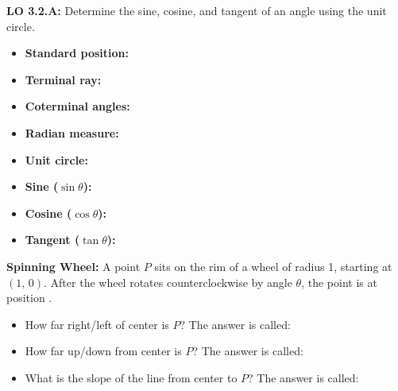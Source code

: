 \documentclass[10pt]{article}
\begin{document}
\namedateperiod

\vspace{0.10in}

\begin{objectivebox}
\textbf{LO 3.2.A:} Determine the sine, cosine, and tangent of an angle using the unit circle.\\[4pt]
\end{objectivebox}

\vspace{0.10in}

\begin{vocabbox}
\begin{itemize}[leftmargin=1.4em, itemsep=4pt]
  \item \textbf{Standard position:} 
  \item \textbf{Terminal ray:} 
  \item \textbf{Coterminal angles:} 
  \item \textbf{Radian measure:} 
  \item \textbf{Unit circle:} 
  \item \textbf{Sine ($\sin\theta$):} 
  \item \textbf{Cosine ($\cos\theta$):} 
  \item \textbf{Tangent ($\tan\theta$):} 
\end{itemize}
\end{vocabbox}

\vspace{0.10in}

\begin{hookbox}
\textbf{Spinning Wheel:} A point $P$ sits on the rim of a wheel of radius 1, starting at $(1,\, 0)$.
After the wheel rotates counterclockwise by angle $\theta$, the point is at position
\ans{$(\cos\theta,\; \sin\theta)$}.
\begin{itemize}[leftmargin=1.4em, itemsep=2pt]
  \item How far right/left of center is $P$? \hfill The answer is called: 
  \item How far up/down from center is $P$? \hfill The answer is called: 
  \item What is the slope of the line from center to $P$? \hfill The answer is called: 
\end{itemize}
\end{hookbox}
\end{document}
